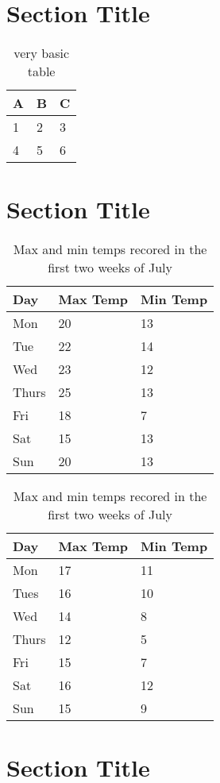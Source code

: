 \section{Section Title}
    \begin{table}[h]
        \centering
        \begin{tabular}{l | l | l}
            A & B & C \\
            \hline
            1 & 2 & 3 \\
            4 & 5 & 6 \\
        \end{tabular}
        \caption{very basic table}
        \label{tab:abc}
    \end{table}

\section{Section Title}
    \begin{table}[h]
        \begin{subtable}[h]{0.45\textwidth}
            \centering
            \begin{tabular}{l | l | l}
                Day & Max Temp & Min Temp \\
                \hline \hline
                Mon & 20 & 13 \\
                Tue & 22 & 14 \\
                Wed & 23 & 12 \\
                Thurs & 25 & 13 \\
                Fri & 18 & 7 \\
                Sat & 15 & 13 \\
                Sun & 20 & 13
            \end{tabular}
            \caption{First Week}
            \label{tab:week1}
        \end{subtable}
        \hfill
        \begin{subtable}[h]{0.45\textwidth}
            \centering
            \begin{tabular}{l | l | l}
                Day & Max Temp & Min Temp \\
                \hline \hline
                Mon & 17 & 11 \\
                Tues & 16 & 10 \\
                Wed & 14 & 8 \\
                Thurs & 12 & 5 \\
                Fri & 15 & 7 \\
                Sat & 16 & 12 \\
                Sun & 15 & 9
            \end{tabular}
            \caption{Second Week}
            \label{tab:week2}
        \end{subtable}
        \caption{Max and min temps recored in the first two weeks of July}
        \label{tab:temps}
    \end{table}

\section{Section Title}
